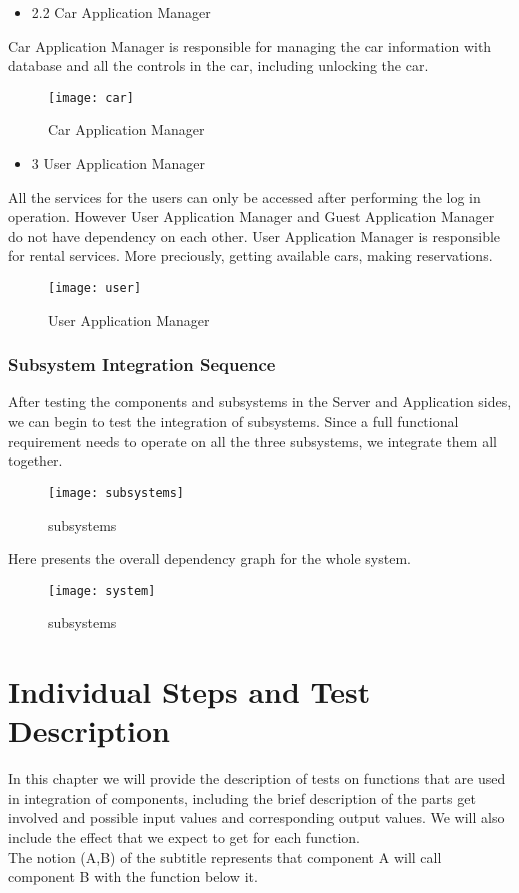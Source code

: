 \documentclass{article}
\begin{document}
  \begin{itemize}
 	\item 2.2 Car Application Manager
 \end{itemize}
Car Application Manager is responsible for managing the car information with database and all the controls in the car, including unlocking the car. 
\begin{figure}[h]
	\centering
	\texttt{[image: car]}
	\caption{Car Application Manager}
\end{figure}
\begin{itemize}
	\item 3 User Application Manager
\end{itemize}
All the services for the users can only be accessed after performing the log in operation. However User Application Manager and Guest Application Manager do not have dependency on each other. User Application Manager is responsible for rental services. More preciously, getting available cars, making reservations.
\begin{figure}[h]
	\centering
	\texttt{[image: user]}
	\caption{User Application Manager}
\end{figure}
\newpage
  \subsubsection{Subsystem Integration Sequence}
  After testing the components and subsystems in the Server and Application sides, we can begin to test the integration of subsystems. Since a full functional requirement needs to operate on all the three subsystems, we integrate them all together.
  \begin{figure}[h]
  	\centering
  	\texttt{[image: subsystems]}
  	\caption{subsystems}
  \end{figure}
\newline
\newpage
  Here presents the overall dependency graph for the whole system.
    \begin{figure}[h]
  	\centering
  	\texttt{[image: system]}
  	\caption{subsystems}
  \end{figure}
\newline
\newpage
\section{Individual Steps and Test Description}
In this chapter we will provide the description of tests on functions that are used in integration of components, including the brief description of the parts get involved and possible input values and corresponding output values. We will also include the effect that we expect to get for each function.\\
The notion (A,B) of the subtitle represents that component A will call component B with the function below it.
\end{document}
